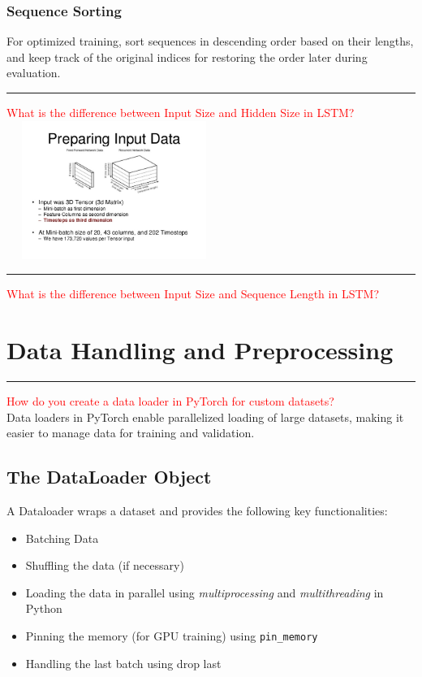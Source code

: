 \documentclass{article}
\newcommand{\code}[1]{\colorbox{light-gray}{\texttt{#1}}}
\begin{document}
\subsubsection{Sequence Sorting}
For optimized training, sort sequences in descending order based on their lengths, and keep track of the original indices for restoring the order later during evaluation.
\noindent
{\color{red} \rule{\linewidth}{0.5mm}}
\textcolor{red}{What is the difference between Input Size and Hidden Size in LSTM?} \\
\noindent
\includegraphics[width=7cm, height=4.5cm]{LSTM/images/InputData.jpg}
\noindent
{\color{red} \rule{\linewidth}{0.5mm}}
\textcolor{red}{What is the difference between Input Size and Sequence Length in LSTM?} \\
\noindent
\section{Data Handling and Preprocessing}
\noindent
{\color{red} \rule{\linewidth}{0.5mm}}
\textcolor{red}{How do you create a data loader in PyTorch for custom datasets?} \\
\noindent
Data loaders in PyTorch enable parallelized loading of large datasets, making it easier to manage data for training and validation.
\subsection{The DataLoader Object}
A Dataloader wraps a dataset and provides the following key functionalities:
\begin{itemize}
    \item Batching Data
    \item Shuffling the data (if necessary)
    \item Loading the data in parallel using \textit{multiprocessing} and \textit{multithreading} in Python
    \item Pinning the memory (for GPU training) using \code{pin\_memory}
    \item Handling the last batch using drop last
\end{itemize}
\end{document}

